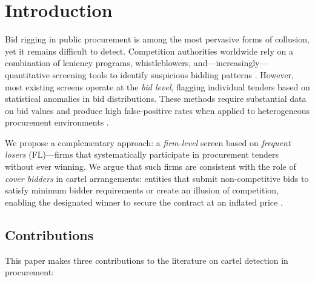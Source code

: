 \documentclass[12pt]{elsarticle}
\begin{document}
\section{Introduction}
\label{sec:intro}

Bid rigging in public procurement is among the most pervasive forms of collusion, yet it remains difficult to detect. Competition authorities worldwide rely on a combination of leniency programs, whistleblowers, and---increasingly---quantitative screening tools to identify suspicious bidding patterns \citep{harrington2008detecting, imhof2019detecting}. However, most existing screens operate at the \textit{bid level}, flagging individual tenders based on statistical anomalies in bid distributions. These methods require substantial data on bid values and produce high false-positive rates when applied to heterogeneous procurement environments \citep{sanchezgraells2019screening}.

We propose a complementary approach: a \textit{firm-level} screen based on \textit{frequent losers} (FL)---firms that systematically participate in procurement tenders without ever winning. We argue that such firms are consistent with the role of \textit{cover bidders} in cartel arrangements: entities that submit non-competitive bids to satisfy minimum bidder requirements or create an illusion of competition, enabling the designated winner to secure the contract at an inflated price \citep{porter1993detection, marshall2012economics}.

\subsection{Contributions}

This paper makes three contributions to the literature on cartel detection in procurement:
\end{document}
